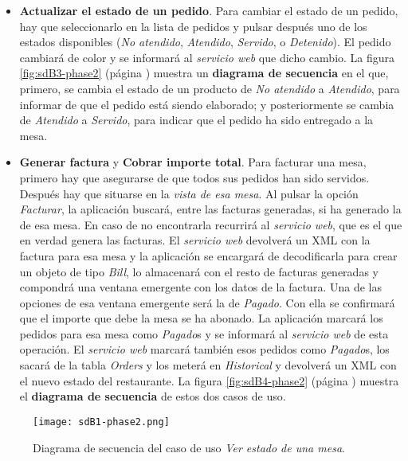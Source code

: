 \begin{itemize}
\item \textbf{Actualizar el estado de un pedido}. Para cambiar el estado de
un pedido, hay que seleccionarlo en la lista de pedidos y pulsar después uno
de los estados disponibles (\emph{No atendido}, \emph{Atendido},
\emph{Servido}, o \emph{Detenido}). El pedido cambiará de color y se informará
al \emph{servicio web} que dicho cambio.
La figura \ref{fig:sdB3-phase2} (página \pageref{fig:sdB3-phase2}) muestra
un \textbf{diagrama de secuencia} en el que, primero, se cambia el estado de
un producto de \emph{No atendido} a \emph{Atendido}, para informar de que
el pedido está siendo elaborado; y posteriormente se cambia de \emph{Atendido}
a \emph{Servido}, para indicar que el pedido ha sido entregado a la mesa.

\item \textbf{Generar factura} y  \textbf{Cobrar importe total}. Para
facturar una mesa, primero hay que asegurarse de que todos sus pedidos han
sido servidos. Después hay que situarse en la \emph{vista de esa mesa}.
Al pulsar la opción \emph{Facturar}, la aplicación buscará, entre las facturas
generadas, si ha generado la de esa mesa. En caso de no encontrarla recurrirá
al \emph{servicio web}, que es el que en verdad genera las facturas. El
\emph{servicio web} devolverá un \acs{XML} con la factura para esa mesa y la 
aplicación se encargará de decodificarla para crear un objeto de tipo
\emph{Bill}, lo almacenará con el resto de facturas generadas y compondrá
una ventana emergente con los datos de la factura. Una de las opciones de
esa ventana emergente será la de \emph{Pagado}. Con ella se confirmará que
el importe que debe la mesa se ha abonado. La aplicación marcará los
pedidos para esa mesa como \emph{Pagado}s y se informará al \emph{servicio
web} de esta operación. El \emph{servicio web} marcará también esos pedidos
como \emph{Pagado}s, los sacará de la tabla \emph{Orders} y los meterá en
\emph{Historical} y devolverá un \acs{XML} con el nuevo estado del
restaurante. La figura \ref{fig:sdB4-phase2} (página \pageref{fig:sdB4-phase2})
muestra el \textbf{diagrama de secuencia} de estos dos casos de uso.
\end{itemize}

  \begin{sidewaysfigure}[hp]
    \begin{center}
      \texttt{[image: sdB1-phase2.png]}
      \caption{Diagrama de secuencia del caso de uso \emph{Ver estado de
      una mesa}.}
      \label{fig:sdB1-phase2}
    \end{center}
  \end{sidewaysfigure}

